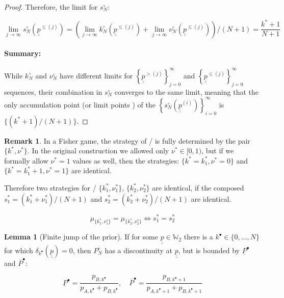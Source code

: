 \documentclass{article}
\theoremstyle{definition}
\newtheorem{lemma}{Lemma}[section]
\newtheorem*{remark}{Remark}
\begin{document}
\begin{proof}
    Therefore, the limit for $s^\circ_N$:

    \begin{equation}
        \lim_{j\to\infty} s^\circ_N (\underline{\underline{p}}^{\le (j)}) = \left ( \lim_{j\to\infty} k^\circ_N(\underline{\underline{p}}^{\le (j)}) + \lim_{j\to\infty} \nu^\circ_N(\underline{\underline{p}}^{\le (j)}) \right )/(N+1) =
        \frac{k^*+1}{N+1}
    \end{equation}

    \paragraph{Summary:}

    While $k^\circ_N$ and $\nu^\circ_N$ have different limits for 
    $\left \{ \underline{\underline{p}}^{> (j)} \right \}_{j=0}^\infty$ and 
    $\left \{ \underline{\underline{p}}^{\le (j)} \right \}_{j=0}^\infty$ sequences, their combination in $s^\circ_N$ converges to the same limit, meaning that the only accumulation point (or limit points \cite{book:Rudin}) of the $\left \{ s^\circ_N(\underline{\underline{p}}^{(i)}) \right \}_{i=0}^\infty$ is $\{(k^*+1)/(N+1)\}$.
    
\end{proof}

\begin{remark}
    \label{remark:PolicyEquivalenceS}
    In a Fisher game, the strategy of \PI/ is fully determined by the pair $\{k^*,\nu^*\}$. In the original construction we allowed only $\nu^* \in [0,1)$, but if we formally allow $\nu^*=1$ values as well, then the strategies: $\{k^*=k^*_1,\nu^*=0\}$ and $\{k^*=k^*_1+1,\nu^*=1\}$ are identical.

    Therefore two strategies for \PI/ $\{k^*_1,\nu^*_1\}$, $\{k^*_2,\nu^*_2\}$ are identical, if the composed $s^*_1=(k^*_1+\nu^*_1)/(N+1)$ and $s^*_2=(k^*_2+\nu^*_2)/(N+1)$ are identical.

    \begin{equation}
        \mu_{\{k^*_1,\nu^*_1\}} = \mu_{\{k^*_2,\nu^*_2\}} \iff
        s^*_1 = s^*_2
    \end{equation}
    
\end{remark}


\begin{lemma}[Finite jump of the prior]
    If for some $\underline{\underline{p}} \in \mathbb{W}_2$ there is a $k^\bullet \in \{0,\dots,N\}$ for which $\delta_{k^\bullet}(\underline{\underline{p}}) = 0$, then
    $P^\circ_N$ has a discontinuity at $\underline{\underline{p}}$, but is bounded by $\underline{P}^\bullet$ and $\overline{P}^\bullet$:
    
    \begin{equation}
    \label{lamma:PLowerUpper}
        \underline{P}^\bullet = \frac{p_{B,k^\bullet}}{p_{A,k^\bullet}+p_{B,k^\bullet}}, \quad
        \overline{P}^\bullet = \frac{p_{B,k^\bullet+1}}{p_{A,k^\bullet+1}+p_{B,k^\bullet+1}}
    \end{equation}
    
\end{lemma}
\end{document}
